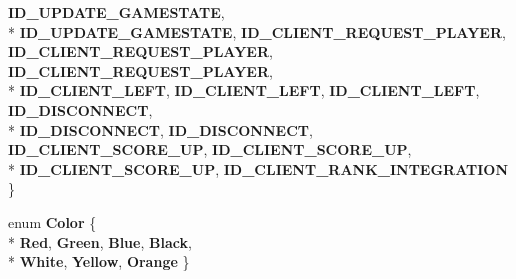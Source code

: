 \begin{DoxyCompactItemize}
{\bfseries I\-D\-\_\-\-U\-P\-D\-A\-T\-E\-\_\-\-G\-A\-M\-E\-S\-T\-A\-T\-E}, 
\\*
{\bfseries I\-D\-\_\-\-U\-P\-D\-A\-T\-E\-\_\-\-G\-A\-M\-E\-S\-T\-A\-T\-E}, 
{\bfseries I\-D\-\_\-\-C\-L\-I\-E\-N\-T\-\_\-\-R\-E\-Q\-U\-E\-S\-T\-\_\-\-P\-L\-A\-Y\-E\-R}, 
{\bfseries I\-D\-\_\-\-C\-L\-I\-E\-N\-T\-\_\-\-R\-E\-Q\-U\-E\-S\-T\-\_\-\-P\-L\-A\-Y\-E\-R}, 
{\bfseries I\-D\-\_\-\-C\-L\-I\-E\-N\-T\-\_\-\-R\-E\-Q\-U\-E\-S\-T\-\_\-\-P\-L\-A\-Y\-E\-R}, 
\\*
{\bfseries I\-D\-\_\-\-C\-L\-I\-E\-N\-T\-\_\-\-L\-E\-F\-T}, 
{\bfseries I\-D\-\_\-\-C\-L\-I\-E\-N\-T\-\_\-\-L\-E\-F\-T}, 
{\bfseries I\-D\-\_\-\-C\-L\-I\-E\-N\-T\-\_\-\-L\-E\-F\-T}, 
{\bfseries I\-D\-\_\-\-D\-I\-S\-C\-O\-N\-N\-E\-C\-T}, 
\\*
{\bfseries I\-D\-\_\-\-D\-I\-S\-C\-O\-N\-N\-E\-C\-T}, 
{\bfseries I\-D\-\_\-\-D\-I\-S\-C\-O\-N\-N\-E\-C\-T}, 
{\bfseries I\-D\-\_\-\-C\-L\-I\-E\-N\-T\-\_\-\-S\-C\-O\-R\-E\-\_\-\-U\-P}, 
{\bfseries I\-D\-\_\-\-C\-L\-I\-E\-N\-T\-\_\-\-S\-C\-O\-R\-E\-\_\-\-U\-P}, 
\\*
{\bfseries I\-D\-\_\-\-C\-L\-I\-E\-N\-T\-\_\-\-S\-C\-O\-R\-E\-\_\-\-U\-P}, 
{\bfseries I\-D\-\_\-\-C\-L\-I\-E\-N\-T\-\_\-\-R\-A\-N\-K\-\_\-\-I\-N\-T\-E\-G\-R\-A\-T\-I\-O\-N}
 \}
\item 
enum {\bfseries Color} \{ \\*
{\bfseries Red}, 
{\bfseries Green}, 
{\bfseries Blue}, 
{\bfseries Black}, 
\\*
{\bfseries White}, 
{\bfseries Yellow}, 
{\bfseries Orange}
 \}
\end{DoxyCompactItemize}
